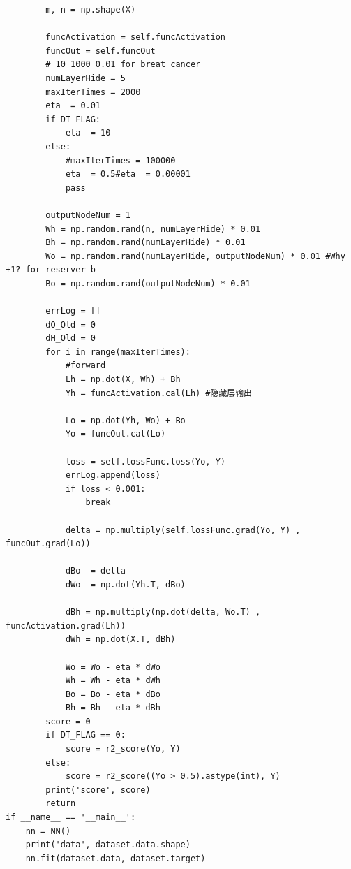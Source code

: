 \documentclass[12pt, a4paper, oneside]{ctexart}
\begin{document}
\begin{appendices}
\begin{lstlisting}
        m, n = np.shape(X)

        funcActivation = self.funcActivation
        funcOut = self.funcOut 
        # 10 1000 0.01 for breat cancer
        numLayerHide = 5
        maxIterTimes = 2000 
        eta  = 0.01
        if DT_FLAG:
            eta  = 10
        else:
            #maxIterTimes = 100000
            eta  = 0.5#eta  = 0.00001
            pass

        outputNodeNum = 1
        Wh = np.random.rand(n, numLayerHide) * 0.01 
        Bh = np.random.rand(numLayerHide) * 0.01 
        Wo = np.random.rand(numLayerHide, outputNodeNum) * 0.01 #Why +1? for reserver b 
        Bo = np.random.rand(outputNodeNum) * 0.01 

        errLog = []
        dO_Old = 0
        dH_Old = 0
        for i in range(maxIterTimes):
            #forward
            Lh = np.dot(X, Wh) + Bh            
            Yh = funcActivation.cal(Lh) #隐藏层输出

            Lo = np.dot(Yh, Wo) + Bo
            Yo = funcOut.cal(Lo)

            loss = self.lossFunc.loss(Yo, Y)
            errLog.append(loss)
            if loss < 0.001:
                break
            
            delta = np.multiply(self.lossFunc.grad(Yo, Y) , funcOut.grad(Lo))

            dBo  = delta
            dWo  = np.dot(Yh.T, dBo)
            
            dBh = np.multiply(np.dot(delta, Wo.T) , funcActivation.grad(Lh))
            dWh = np.dot(X.T, dBh)

            Wo = Wo - eta * dWo
            Wh = Wh - eta * dWh
            Bo = Bo - eta * dBo
            Bh = Bh - eta * dBh
        score = 0
        if DT_FLAG == 0:
            score = r2_score(Yo, Y)
        else:
            score = r2_score((Yo > 0.5).astype(int), Y)
        print('score', score)
        return
if __name__ == '__main__':
    nn = NN()
    print('data', dataset.data.shape)
    nn.fit(dataset.data, dataset.target)
\end{lstlisting}

\end{appendices}
\end{document}
